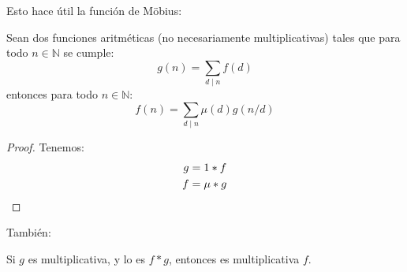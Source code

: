   Esto hace útil la función de Möbius:
  \begin{theorem}
    \label{theo:Moebius-inversion}
    Sean dos funciones aritméticas
    (no necesariamente multiplicativas)
    tales que para todo \(n \in \mathbb{N}\) se cumple:
    \begin{equation*}
      g(n)
	= \sum_{d \mid n} f(d)
    \end{equation*}
    entonces para todo \(n \in \mathbb{N}\):
    \begin{equation*}
      f(n)
	= \sum_{d \mid n} \mu(d) g(n / d)
    \end{equation*}
  \end{theorem}
  \begin{proof}
    Tenemos:
    \begin{align*}
      g
	&= 1 * f \\
      f
	&= \mu * g
      \qedhere
    \end{align*}
  \end{proof}
  También:
  \begin{lemma}
    \label{lem:Dirichlet-fg=>f}
    Si \(g\) es multiplicativa,
    y lo es \(f * g\),
    entonces es multiplicativa \(f\).
  \end{lemma}
